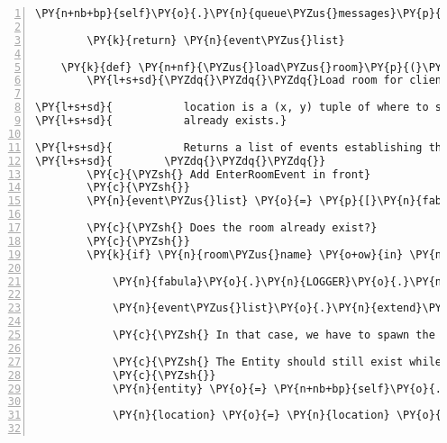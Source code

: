 \begin{Verbatim}[commandchars=\\\{\},numbers=left,firstnumber=1,stepnumber=1]
        \PY{n+nb+bp}{self}\PY{o}{.}\PY{n}{queue\PYZus{}messages}\PY{p}{(}\PY{o}{*}\PY{n}{messages}\PY{p}{)}

        \PY{k}{return} \PY{n}{event\PYZus{}list}

    \PY{k}{def} \PY{n+nf}{\PYZus{}load\PYZus{}room}\PY{p}{(}\PY{n+nb+bp}{self}\PY{p}{,} \PY{n}{client\PYZus{}id}\PY{p}{,} \PY{n}{room\PYZus{}name}\PY{p}{,} \PY{n}{location}\PY{p}{)}\PY{p}{:}
        \PY{l+s+sd}{\PYZdq{}\PYZdq{}\PYZdq{}Load room for client with client\PYZus{}id corresponding to room\PYZus{}name.}

\PY{l+s+sd}{           location is a (x, y) tuple of where to spawn the Entity when the room}
\PY{l+s+sd}{           already exists.}

\PY{l+s+sd}{           Returns a list of events establishing the according room.}
\PY{l+s+sd}{        \PYZdq{}\PYZdq{}\PYZdq{}}
        \PY{c}{\PYZsh{} Add EnterRoomEvent in front}
        \PY{c}{\PYZsh{}}
        \PY{n}{event\PYZus{}list} \PY{o}{=} \PY{p}{[}\PY{n}{fabula}\PY{o}{.}\PY{n}{EnterRoomEvent}\PY{p}{(}\PY{n}{client\PYZus{}id}\PY{p}{,} \PY{n}{room\PYZus{}name}\PY{p}{)}\PY{p}{]}

        \PY{c}{\PYZsh{} Does the room already exist?}
        \PY{c}{\PYZsh{}}
        \PY{k}{if} \PY{n}{room\PYZus{}name} \PY{o+ow}{in} \PY{n+nb+bp}{self}\PY{o}{.}\PY{n}{host}\PY{o}{.}\PY{n}{room\PYZus{}by\PYZus{}id}\PY{o}{.}\PY{n}{keys}\PY{p}{(}\PY{p}{)}\PY{p}{:}

            \PY{n}{fabula}\PY{o}{.}\PY{n}{LOGGER}\PY{o}{.}\PY{n}{debug}\PY{p}{(}\PY{l+s}{\PYZdq{}}\PY{l+s}{Sending existing room}\PY{l+s}{\PYZdq{}}\PY{p}{)}

            \PY{n}{event\PYZus{}list}\PY{o}{.}\PY{n}{extend}\PY{p}{(}\PY{n+nb+bp}{self}\PY{o}{.}\PY{n}{host}\PY{o}{.}\PY{n}{\PYZus{}generate\PYZus{}room\PYZus{}rack\PYZus{}events}\PY{p}{(}\PY{n}{room\PYZus{}name}\PY{p}{)}\PY{p}{)}

            \PY{c}{\PYZsh{} In that case, we have to spawn the Entity manually.}

            \PY{c}{\PYZsh{} The Entity should still exist while we\PYZsq{}re here.}
            \PY{c}{\PYZsh{}}
            \PY{n}{entity} \PY{o}{=} \PY{n+nb+bp}{self}\PY{o}{.}\PY{n}{host}\PY{o}{.}\PY{n}{room\PYZus{}by\PYZus{}client}\PY{p}{[}\PY{n}{client\PYZus{}id}\PY{p}{]}\PY{o}{.}\PY{n}{entity\PYZus{}dict}\PY{p}{[}\PY{n}{client\PYZus{}id}\PY{p}{]}

            \PY{n}{location} \PY{o}{=} \PY{n}{location} \PY{o}{+} \PY{p}{(}\PY{n}{room\PYZus{}name}\PY{p}{,}\PY{p}{)}


\end{Verbatim}

